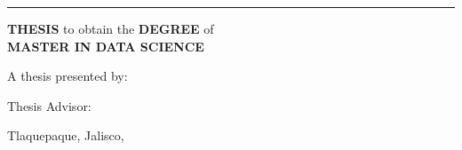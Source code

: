 \begin{titlepage}
\begin{fullwidth}
\begin{center}
        \textcolor{lightgray}{\noindent\rule{10cm}{0.2pt}}
        
        \vspace*{0.5cm}
        
        \Large
        \textcolor{itesodblue}{\textbf{THESIS} to obtain the \textbf{DEGREE} of \\\textbf{MASTER IN DATA SCIENCE}}
        
        \vspace{1cm}
        
        \Large
        \textcolor{itesodblue}{A thesis presented by: \textbf{\myauthor}}
        
        \vspace{1cm}
            
        \Large
        \textcolor{itesodblue}{Thesis Advisor: \textbf{\myadvisors}}
            
        \vspace{1cm}
        
        \vfill
        \large
        \textcolor{itesodblue}{Tlaquepaque, Jalisco, \mydate}
        
    \end{center}
\end{fullwidth}
\end{titlepage}
